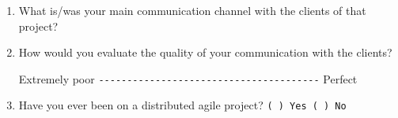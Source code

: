 \documentclass[lnbip]{svmultln}
\begin{document}
\begin{small}
\begin{enumerate}
  \item What is/was your main communication channel with the clients
    of that project?
    \vspace{8pt}

  \item How would you evaluate the quality of your communication with
    the clients?

    Extremely poor \verb=---------------------------------------=
    Perfect \vspace{8pt}

  \item Have you ever been on a distributed agile project?
    \verb=( ) Yes ( ) No= \vspace{8pt}


\end{enumerate}
\end{small}
\end{document}
